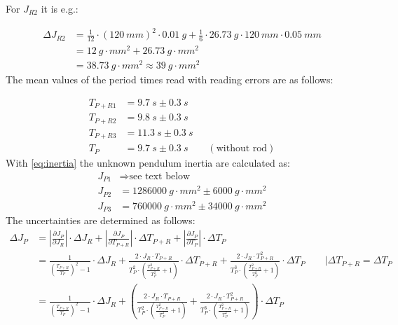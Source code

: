             For \(J_{R2}\) it is e.g.:\par
            \begin{align*}
                \Delta J_{R2}   &=\frac{1}{12}\cdot (\SI{120}{mm})^2\cdot \SI{0.01}{g} + \frac{1}{6}\cdot \SI{26.73}{g}\cdot \SI{120}{mm}\cdot \SI{0.05}{mm}\\
                                &=\SI{12}{g\cdot mm^2}+\SI{26.73}{g\cdot mm^2}\\
                                &=\SI{38.73}{g\cdot mm^2} \approx \SI{39}{g\cdot mm^2}
            \end{align*}
            The mean values of the period times read with reading errors are as follows:\par
            \begin{align}
                T_{P+R1} &=\SI{9.7}{s} \pm \SI{0.3}{s} \\
                T_{P+R2} &=\SI{9.8}{s} \pm \SI{0.3}{s} \\
                T_{P+R3} &=\SI{11.3}{s} \pm \SI{0.3}{s} \\
                T_P &=\SI{9.7}{s} \pm \SI{0.3}{s} \qquad (\text{without rod})
            \end{align}
            With \cref{eq:inertia} the unknown pendulum inertia are calculated as:
            \begin{align}
                J_{P1} &\Rightarrow \text{see text below} \\
                J_{P2} &= \SI{1286000}{g \cdot mm^2} \pm \SI{6000}{g \cdot mm^2} \\
                J_{P3} &= \SI{760000}{g \cdot mm^2} \pm \SI{34000}{g \cdot mm^2}
            \end{align}
            The uncertainties are determined as follows:
            \begin{align}
                \Delta J_P  &= \left| \frac{\partial J_P}{\partial J_R} \right| \cdot \Delta J_R + \left| \frac{\partial J_P}{\partial T_{P+R}} \right| \cdot \Delta T_{P+R} + \left| \frac{\partial J_P}{\partial T_P} \right| \cdot \Delta T_P \nonumber \\
                            &= \frac{1}{\left( \frac{T_{P+R}}{T_P} \right)^2-1} \cdot \Delta J_R + \frac{2 \cdot J_R \cdot T_{P+R}}{T_P^2 \cdot \left( \frac{T_{P+R}^2}{T_P^2}+1 \right)} \cdot \Delta T_{P+R} + \frac{2 \cdot J_R \cdot T_{P+R}^2}{T_P^3 \cdot \left( \frac{T_{P+R}^2}{T_P^2}+1 \right)} \cdot \Delta T_P \qquad \Big| \Delta T_{P+R} = \Delta T_P \nonumber \\
                            &= \frac{1}{\left( \frac{T_{P+R}}{T_P} \right)^2-1} \cdot \Delta J_R + \left( \frac{2 \cdot J_R \cdot T_{P+R}}{T_P^2 \cdot \left( \frac{T_{P+R}^2}{T_P^2}+1 \right)} + \frac{2 \cdot J_R \cdot T_{P+R}^2}{T_P^3 \cdot \left( \frac{T_{P+R}^2}{T_P^2}+1 \right)} \right) \cdot \Delta T_P
            \end{align}
